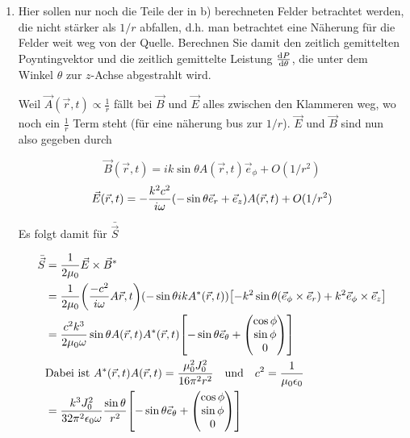 \begin{enumerate}[label=\alph*)]
  \item Hier sollen nur noch die Teile der in b) berechneten Felder
    betrachtet werden, die nicht stärker als $1/r$ abfallen, d.h. man
    betrachtet eine Näherung für die Felder weit weg von der Quelle.
    Berechnen Sie damit den zeitlich gemittelten Poyntingvektor und
    die zeitlich gemittelte Leistung $\dv {P}{\theta}$, die unter dem
    Winkel $\theta$ zur $z$-Achse abgestrahlt wird.

    Weil $\vec A(\vec r, t)\propto \frac{1}{r}$ fällt bei $\vec B$ und 
    $\vec E$ alles zwischen den Klammeren weg, wo noch 
    ein $\frac{1}{r}$ Term
    steht (für eine näherung bus zur $1/r$). $\vec E$ und $\vec B$ sind
    nun also gegeben durch

    \begin{equation}
      \vec B(\vec r, t) = ik\sin\theta A(\vec r, t)\vec e_\phi
      +O(1/r^2)
    \end{equation}
    \begin{equation}
      \vec E(\vec r, t) 
      = -\frac{k^2c^2}{i\omega} \qty(-\sin\theta \vec e_r+\vec e_z)
      A(\vec r, t)
      +O(1/r^2)
    \end{equation}

    Es folgt damit für 
    $\bar{\vec{S}}$
    
    \begin{equation}
      \begin{split}
        \bar{\vec{S}}
        &= \frac{1}{2\mu_0} \vec E \times \vec B^*\\
        &=\frac{1}{2\mu_0}\qty(\frac{-c^2}{i\omega}A{\vec r, t})
        \qty(-\sin\theta ik A^*(\vec r, t))
        \qty[-k^2\sin\theta (\vec e_\phi \times \vec e_r)
        +k^2 \vec e_\phi \times \vec e_z
        ]\\
        &= \frac{c^2k^3}{2\mu_0 \omega}\sin\theta A(\vec r, t)A^*(\vec r, t)
        \qty[-\sin\theta\vec e_\theta + 
        \begin{pmatrix}
          \cos\phi\\\sin\phi\\0
        \end{pmatrix}
        ]\\
        &\text{Dabei ist}\ 
        A^*(\vec r,t)A(\vec r, t)=\frac{\mu_0^2J_0^2}{16\pi^2r^2}
        \quad\text{und}\quad
        c^2=\frac{1}{\mu_0\epsilon_0}\\
        &= \frac{k^3J_0^2}{32\pi^2\epsilon_0\omega} 
        \frac{\sin\theta}{r^2}
        \qty[-\sin\theta \vec e_\theta+
        \begin{pmatrix}
          \cos\phi\\\sin\phi\\0
        \end{pmatrix}
        ]
      \end{split}
    \end{equation}
    

\end{enumerate}
